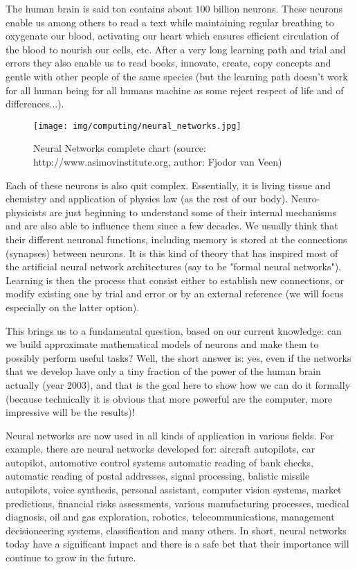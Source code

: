 	The human brain is said ton contains about $100$ billion neurons. These neurons enable us among others to read a text while maintaining regular breathing to oxygenate our blood, activating our heart which ensures efficient circulation of the blood to nourish our cells, etc. After a very long learning path and trial and errors they also enable us to read books, innovate, create, copy concepts and gentle with other people of the same species (but the learning path doesn't work for all human being for all humans machine as some reject respect of life and of differences...).
	\begin{figure}[H]
		\centering
	  	\texttt{[image: img/computing/neural\_networks.jpg]}
		\caption[Neural Networks complete chart]{Neural Networks complete chart (source: http://www.asimovinstitute.org, author: Fjodor van Veen)}
	\end{figure}
	Each of these neurons is also quit complex. Essentially, it is living tissue and chemistry and application of physics law (as the rest of our body). Neuro-physicists are just beginning to understand some of their internal mechanisms and are also able to influence them since a few decades. We usually think that their different neuronal functions, including memory is stored at the connections (synapses) between neurons. It is this kind of theory that has inspired most of the artificial neural network architectures (say to be "formal neural networks"). Learning is then the process that consist either to establish new connections, or modify existing one by trial and error or by an external reference (we will focus especially on the latter option).
	
	This brings us to a fundamental question, based on our current knowledge: can we build approximate mathematical models of neurons and make them to possibly perform useful tasks? Well, the short answer is: yes, even if the networks that we develop have only a tiny fraction of the power of the human brain actually (year 2003), and that is the goal here to show how we can do it formally (because technically it is obvious that more powerful are the computer, more impressive will be the results)!
	
	Neural networks are now used in all kinds of application in various fields. For example, there are neural networks developed for: aircraft autopilots, car autopilot, automotive control systems automatic reading of bank checks, automatic reading of postal addresses, signal processing, balistic missile autopilots, voice synthesis, personal assistant, computer vision systems, market predictions, financial risks assessments, various manufacturing processes, medical diagnosis, oil and gas exploration, robotics, telecommunications, management decisioneering systems, classification and many others. In short, neural networks today have a significant impact and there is a safe bet that their importance will continue to grow in the future.
	
